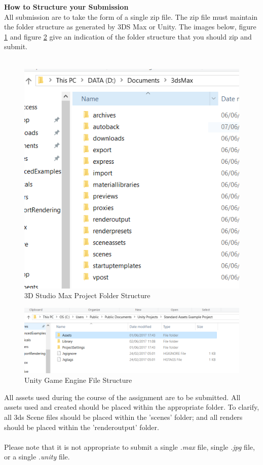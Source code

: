 \textbf{How to Structure your Submission}
\\
All submission are to take the form of a single zip file.  The zip file must maintain the folder structure as generated by 3DS Max or Unity.   The images below, figure \ref{fig:3dsstructure} and figure \ref{fig:unity} give an indication of the folder structure that you should zip and submit.\\ \\

\begin{figure}[h]
	\centering
	\includegraphics[width=0.5\linewidth]{img/3dsStructure.jpg}
	\caption{3D Studio Max Project Folder Structure}
	\label{fig:3dsstructure}
\end{figure}
\begin{figure}[h]
	\centering
	\includegraphics[width=0.9\linewidth]{img/Unity.jpg}
	\caption{Unity Game Engine File Structure}
	\label{fig:unity}
\end{figure}

All assets used during the course of the assignment are to be submitted.  All assets used and created should be placed within the appropriate folder.  To clarify, all 3ds Scene files should be placed within the 'scenes' folder; and all renders should be placed within the 'renderoutput' folder.
\\
\\
Please note that it is not appropriate to submit a single \textit{.max} file, single \textit{.jpg} file, or a single \textit{.unity} file.  